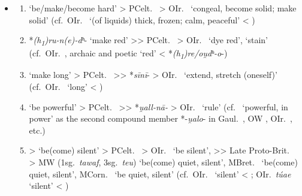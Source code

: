 \documentclass[output=paper,colorlinks,citecolor=brown]{langscibook}
\begin{document}
\begin{itemize}
    \item[(B)] 
\begin{enumerate}
    \item \label{ref:itemhard}
     ‘be/make/become hard’ > PCelt.\  > OIr.\   ‘congeal, become solid; make solid’         (cf.\ OIr.\   ‘(of liquids) thick, frozen; calm, peaceful’ < )
    
    \item \label{ref:itemred} {*\textit{(h\textsubscript{1})ru-n(e)-dʰ}-}   ‘make red’ >{>} PCelt.\  > OIr.\   ‘dye red’,  ‘stain’         (cf.\ OIr.\  , archaic and poetic  ‘red’ < *\textit{(h\textsubscript{1})re/ou̯dʰ-o}-) 

    \item \label{ref:itemlong}  ‘make long’ > PCelt.\  >{>} *\textit{sīnī}- > OIr.\   ‘extend, stretch (oneself)’ 
        (cf.\ OIr.\   ‘long’ < )

    \item \label{ref:itempowerful}
     ‘be powerful’ > PCelt.\  >{>} *\textit{u̯all-nā-} > OIr.\  \mbox{} ‘rule’ 
        (cf.\  ‘powerful, in power’ as the second compound member *-\textit{u̯alo}- in Gaul.\ , OW , OIr.\  , etc.)
    
    \item \label{ref:itemsilent}
     > ‘be(come) silent’ > PCelt.\  > OIr.\   ‘be silent’, >{>} Late Proto-Brit.\  > MW  (1sg.\ \textit{tawaf}, 3sg.\ \textit{teu}) ‘be(come) quiet, silent’, MBret.\  ‘be(come) quiet, silent’, MCorn.\  ‘be quiet, silent’ 
        (cf.\ OIr.\   ‘silent’ < ; OIr.\  \textit{túae}  ‘silent’ < )


\end{enumerate}
\end{itemize}
\end{document}
